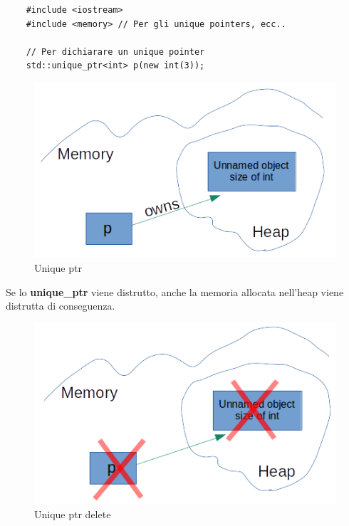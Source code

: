 \begin{lstlisting}
	#include <iostream>
	#include <memory> // Per gli unique pointers, ecc..
	
	// Per dichiarare un unique pointer
	std::unique_ptr<int> p(new int(3));
\end{lstlisting}

\begin{figure}[H]
	\centering
	\includegraphics[width=1\textwidth, height=1\textheight, keepaspectratio]{./imgs/unique_ptr_definition.png}
	\caption{Unique ptr}
	\label{fig:unique_ptr_definition}
\end{figure}

\textsf{\small Se lo \textbf{unique\_ptr} viene distrutto, anche la memoria allocata nell'heap viene distrutta di conseguenza.} \\

\begin{figure}[H]
	\centering
	\includegraphics[width=1\textwidth, height=1\textheight, keepaspectratio]{./imgs/unique_ptr_delete.png}
	\caption{Unique ptr delete}
	\label{fig:unique_ptr_delete}
\end{figure}

